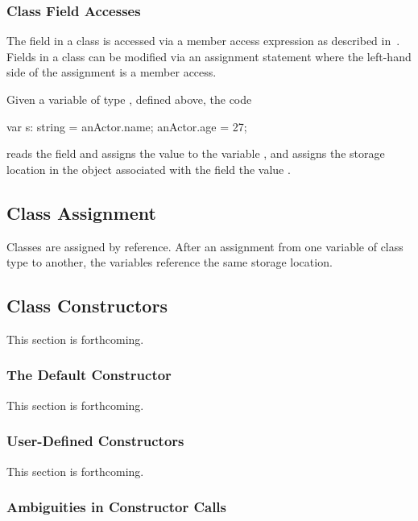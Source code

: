 \subsubsection{Class Field Accesses}
\label{Class_Field_Accesses}

The field in a class is accessed via a member access expression as
described in~.  Fields in a class can
be modified via an assignment statement where the left-hand side of
the assignment is a member access.
\begin{example}
Given a variable  of type , defined above,
the code
\begin{chapel}
var s: string = anActor.name;
anActor.age = 27;
\end{chapel}
reads the field  and assigns the value to the variable
, and assigns the storage location in the object
 associated with the field  the value
.
\end{example}

\subsection{Class Assignment}
\label{Class_Assignment}

Classes are assigned by reference.  After an assignment from one
variable of class type to another, the variables reference the same
storage location.

\subsection{Class Constructors}
\label{Class_Constructors}

This section is forthcoming.

\subsubsection{The Default Constructor}
\label{The_Default_Constructor}

This section is forthcoming.

\subsubsection{User-Defined Constructors}
\label{User-Defined_Constructors}

This section is forthcoming.

\subsubsection{Ambiguities in Constructor Calls}
\label{Ambiguities_in_Constructor_Calls}

